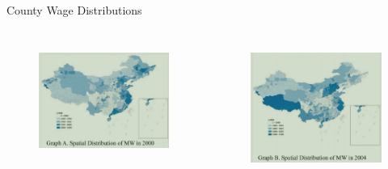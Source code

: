 \documentclass[aspectratio = 169]{beamer}
\begin{document}
    \begin{frame}{County Wage Distributions}
        \begin{columns}
            \begin{figure}
                \centering
                \includegraphics[width = \textwidth, height = 0.5\textheight]{climate_change/beamer/wd2000}
                \label{fig:chinese-mw2000}
            \end{figure}

            \begin{figure}
                \centering
                \includegraphics[width = \textwidth, height = 0.5\textheight]{climate_change/beamer/wd2004}
                \label{fig:chinese-mw2004}
            \end{figure}


\end{columns}
\end{frame}
\end{document}
